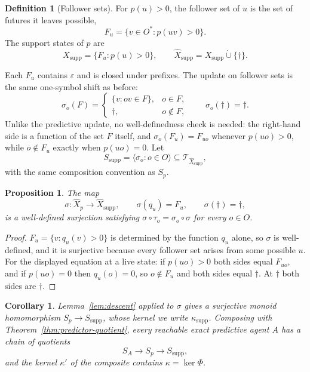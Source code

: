 \documentclass[10pt]{article}
\newtheorem{proposition}[theorem]{Proposition}
\newtheorem{corollary}[theorem]{Corollary}
\theoremstyle{definition}
\newtheorem{definition}[theorem]{Definition}
\theoremstyle{remark}
\newcommand{\Obs}{O}
\newcommand{\eps}{\varepsilon}
\begin{document}
\begin{definition}[Follower sets]
For $p(u)>0$, the follower set of $u$ is the set of futures it leaves
possible,
\[
  F_u=\{v\in\Obs^*:p(uv)>0\}.
\]
The support states of $p$ are
\[
  X_{\mathrm{supp}}=\{F_u:p(u)>0\},
  \qquad
  \widehat X_{\mathrm{supp}}
  =X_{\mathrm{supp}}\mathbin{\dot\cup}\{\dagger\}.
\]
\end{definition}

Each $F_u$ contains $\eps$ and is closed under prefixes.  The update on
follower sets is the same one-symbol shift as before:
\[
  \sigma_o(F)=
  \begin{cases}
    \{v:ov\in F\},&o\in F,\\
    \dagger,&o\notin F,
  \end{cases}
  \qquad
  \sigma_o(\dagger)=\dagger.
\]
Unlike the predictive update, no well-definedness check is needed: the
right-hand side is a function of the set $F$ itself, and
$\sigma_o(F_u)=F_{uo}$ whenever $p(uo)>0$, while $o\notin F_u$ exactly
when $p(uo)=0$.  Let
\[
  S_{\mathrm{supp}}
  =\langle\sigma_o:o\in\Obs\rangle
  \subseteq\mathcal T_{\widehat X_{\mathrm{supp}}},
\]
with the same composition convention as $S_p$.

\begin{proposition}
\label{prop:support-quotient}
The map
\[
  \sigma:\widehat X_p\to\widehat X_{\mathrm{supp}},
  \qquad
  \sigma(q_u)=F_u,
  \qquad
  \sigma(\dagger)=\dagger,
\]
is a well-defined surjection satisfying
$\sigma\circ\tau_o=\sigma_o\circ\sigma$ for every $o\in\Obs$.
\end{proposition}

\begin{proof}
$F_u=\{v:q_u(v)>0\}$ is determined by the function $q_u$ alone, so
$\sigma$ is well-defined, and it is surjective because every follower set
arises from some possible $u$.  For the displayed equation at a live
state: if $p(uo)>0$ both sides equal $F_{uo}$, and if $p(uo)=0$ then
$q_u(o)=0$, so $o\notin F_u$ and both sides equal $\dagger$.  At
$\dagger$ both sides are $\dagger$.
\end{proof}

\begin{corollary}
\label{cor:support-tower}
Lemma~\ref{lem:descent} applied to $\sigma$ gives a surjective monoid
homomorphism $S_p\to S_{\mathrm{supp}}$, whose kernel we write
$\kappa_{\mathrm{supp}}$.  Composing with
Theorem~\ref{thm:predictor-quotient}, every reachable exact predictive
agent $A$ has a chain of quotients
\[
  S_A\longrightarrow S_p\longrightarrow S_{\mathrm{supp}},
\]
and the kernel $\kappa'$ of the composite contains
$\kappa=\ker\Phi$.
\end{corollary}
\end{document}
